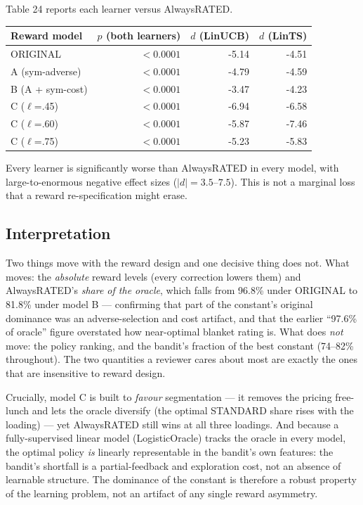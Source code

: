 Table 24 reports each learner versus AlwaysRATED.

\label{tab:5.11.2}

{\def\LTcaptype{none}
\begin{longtable}{@{}lrrr@{}}
\toprule
Reward model & \(p\) (both learners) & \(d\) (LinUCB) & \(d\) (LinTS) \\
\midrule
\endhead
\bottomrule
\endlastfoot
ORIGINAL & \(< 0.0001\) & -5.14 & -4.51 \\
A (sym-adverse) & \(< 0.0001\) & -4.79 & -4.59 \\
B (A + sym-cost) & \(< 0.0001\) & -3.47 & -4.23 \\
C ($\ell$=.45) & \(< 0.0001\) & -6.94 & -6.58 \\
C ($\ell$=.60) & \(< 0.0001\) & -5.87 & -7.46 \\
C ($\ell$=.75) & \(< 0.0001\) & -5.23 & -5.83 \\
\end{longtable}
}

Every learner is significantly worse than AlwaysRATED in every model, with large-to-enormous negative effect sizes (\(|d| = 3.5\)--\(7.5\)). This is not a marginal loss that a reward re-specification might erase.

\subsection{Interpretation}\label{reward-sensitivity-interpretation}

Two things move with the reward design and one decisive thing does not. What moves: the \emph{absolute} reward levels (every correction lowers them) and AlwaysRATED's \emph{share of the oracle}, which falls from 96.8\% under ORIGINAL to 81.8\% under model B --- confirming that part of the constant's original dominance was an adverse-selection and cost artifact, and that the earlier ``97.6\% of oracle'' figure overstated how near-optimal blanket rating is. What does \emph{not} move: the policy ranking, and the bandit's fraction of the best constant (74--82\% throughout). The two quantities a reviewer cares about most are exactly the ones that are insensitive to reward design.

Crucially, model C is built to \emph{favour} segmentation --- it removes the pricing free-lunch and lets the oracle diversify (the optimal STANDARD share rises with the loading) --- yet AlwaysRATED still wins at all three loadings. And because a fully-supervised linear model (LogisticOracle) tracks the oracle in every model, the optimal policy \emph{is} linearly representable in the bandit's own features: the bandit's shortfall is a partial-feedback and exploration cost, not an absence of learnable structure. The dominance of the constant is therefore a robust property of the learning problem, not an artifact of any single reward asymmetry.

